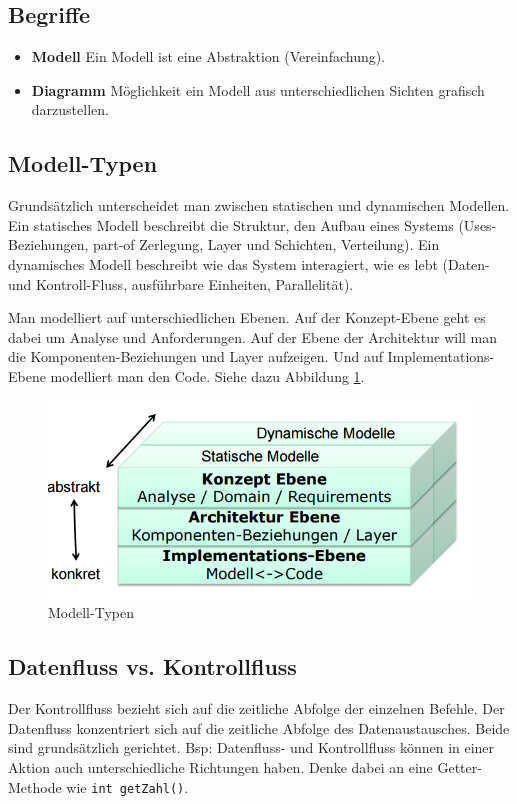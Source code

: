 \subsection{Begriffe}
\begin{itemize}
	\item \textbf{Modell} Ein Modell ist eine Abstraktion (Vereinfachung).
	\item \textbf{Diagramm} Möglichkeit ein Modell aus unterschiedlichen Sichten grafisch darzustellen.
\end{itemize}

\subsection{Modell-Typen}
Grundsätzlich unterscheidet man zwischen statischen und dynamischen Modellen. Ein statisches Modell beschreibt die Struktur, den Aufbau eines Systems (Uses-Beziehungen, part-of Zerlegung, Layer und Schichten, Verteilung). Ein dynamisches Modell beschreibt wie das System interagiert, wie es lebt  (Daten- und Kontroll-Fluss, ausführbare Einheiten, Parallelität).

Man modelliert auf unterschiedlichen Ebenen. Auf der Konzept-Ebene geht es dabei um Analyse und Anforderungen. Auf der Ebene der Architektur will man die Komponenten-Beziehungen und Layer aufzeigen. Und auf Implementations-Ebene modelliert man den Code. Siehe dazu Abbildung \ref{fig:modelltypen}.

\begin{figure}[h!]
\centering
\includegraphics[width=0.7\linewidth]{fig/modelltypen}
\caption{Modell-Typen}
\label{fig:modelltypen}
\end{figure}

\subsection{Datenfluss vs. Kontrollfluss}
Der Kontrollfluss bezieht sich auf die zeitliche Abfolge der einzelnen Befehle. Der Datenfluss konzentriert sich auf die zeitliche Abfolge des Datenaustausches. Beide sind grundsätzlich gerichtet. Bsp: Datenfluss- und Kontrollfluss können in einer Aktion auch unterschiedliche Richtungen haben. Denke dabei an eine Getter-Methode wie \texttt{int getZahl()}.

